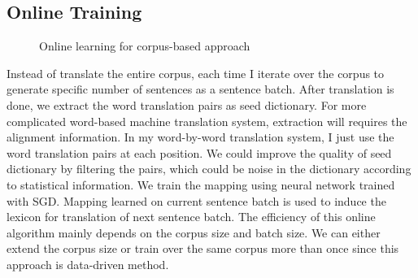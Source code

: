 \subsection{Online Training}

\begin{figure}[H]
	\centering
	\begin{minipage}{.7\linewidth}
		\begin{algorithm}[H]
			\SetAlgoLined
			\caption{Online learning for corpus-based approach}
		\end{algorithm}
	\end{minipage}
\end{figure}
Instead of translate the entire corpus, each time I iterate over the corpus to generate specific number of sentences as a sentence batch. After translation is done, we extract the word translation pairs as seed dictionary. For more complicated word-based machine translation system, extraction will requires the alignment information. In my word-by-word translation system, I just use the word translation pairs at each position. We could improve the quality of seed dictionary by filtering the pairs, which could be noise in the dictionary according to statistical information. We train the mapping using neural network trained with SGD. Mapping learned on current sentence batch is used to induce the lexicon for translation of next sentence batch. The efficiency of this online algorithm mainly depends on the corpus size and batch size. We can either extend the corpus size or train over the same corpus more than once since this approach is data-driven method.


